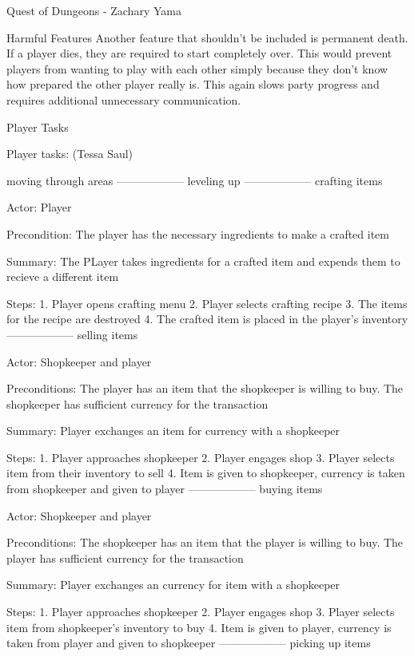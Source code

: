 \documentclass[12pt]{report}
\begin{document}
\begin{section}{Quest of Dungeons - Zachary Yama}
\begin{subsection}{Harmful Features}
Another feature that shouldn’t be included is permanent death. If a player dies, they are required to 
start completely over. This would prevent players from wanting to play with each other simply because 
they don’t know how prepared the other player really is. This again slows party progress and requires 
additional unnecessary communication.
 
\end{subsection}
\end{section}

\begin{section}{Player Tasks} %

Player tasks: (Tessa Saul)

moving through areas 
------------------
leveling up
------------------
crafting items

Actor: Player

Precondition: The player has the necessary ingredients to make a crafted item

Summary: The PLayer takes ingredients for a crafted item and expends them to recieve a different item

Steps:
1. Player opens crafting menu
2. Player selects crafting recipe
3. The items for the recipe are destroyed
4. The crafted item is placed in the player's inventory
------------------
selling items

Actor: Shopkeeper and player

Preconditions: The player has an item that the shopkeeper is willing to buy. The shopkeeper has sufficient
currency for the transaction

Summary: Player exchanges an item for currency with a shopkeeper

Steps: 
1. Player approaches shopkeeper
2. Player engages shop
3. Player selects item from their inventory to sell
4. Item is given to shopkeeper, currency is taken from shopkeeper and given to player
------------------
buying items

Actor: Shopkeeper and player

Preconditions: The shopkeeper has an item that the player is willing to buy. The player has sufficient
currency for the transaction

Summary: Player exchanges an currency for item with a shopkeeper

Steps: 
1. Player approaches shopkeeper
2. Player engages shop
3. Player selects item from shopkeeper's inventory to buy
4. Item is given to player, currency is taken from player and given to shopkeeper
------------------
picking up items


\end{section}
\end{document}
